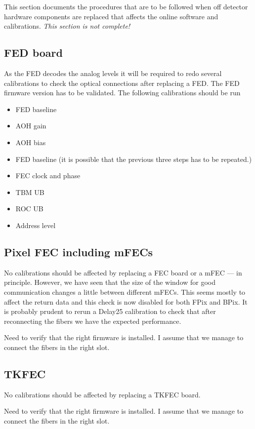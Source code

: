 

This section documents the procedures that are to be followed
when off detector hardware components are replaced that 
affects the online software and calibrations. {\it This 
section is not complete!}

\subsection{FED board}

As the FED decodes the analog levels it will be required to
redo several calibrations to check the optical connections
after replacing a FED. The FED firmware version has to
be validated.
The following calibrations should be run
\begin{itemize}
\item FED baseline
\item AOH gain
\item AOH bias
\item FED baseline (it is possible that the previous three steps
          has to be repeated.)
\item FEC clock and phase
\item TBM UB
\item ROC UB
\item Address level
\end{itemize}

\subsection{Pixel FEC including mFECs}

 No calibrations should be affected by replacing a FEC board
or a mFEC --- in principle. However, we have seen that the 
size of the window for good communication changes a little
between different mFECs. This seems mostly to affect the 
return data and this check is now disabled for both FPix
and BPix. It is probably prudent to rerun a Delay25 calibration
to check that after reconnecting the fibers we have the expected 
performance.

Need to verify that the right firmware is installed. I assume
that we manage to connect the fibers in the right slot.

\subsection{TKFEC}

 No calibrations should be affected by replacing a TKFEC board.

Need to verify that the right firmware is installed. I assume
that we manage to connect the fibers in the right slot.

